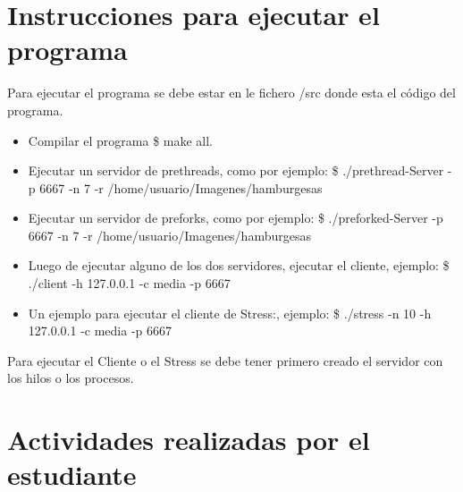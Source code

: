 \documentclass{article}
\begin{document}
\section{Instrucciones para ejecutar el programa}
Para ejecutar el programa se debe estar en le fichero /src donde esta el código del programa.
    \begin{itemize}
        \item Compilar el programa \$ make all.
        \item Ejecutar un servidor de prethreads, como por ejemplo: \$ ./prethread-Server -p 6667 -n 7 -r /home/usuario/Imagenes/hamburgesas
        \item Ejecutar un servidor de preforks, como por ejemplo: \$ ./preforked-Server -p 6667 -n 7 -r /home/usuario/Imagenes/hamburgesas
        \item Luego de ejecutar alguno de los dos servidores, ejecutar el cliente, ejemplo: \$ ./client -h 127.0.0.1 -c media -p 6667
        \item Un ejemplo para ejecutar el cliente de Stress:, ejemplo: \$ ./stress -n 10 -h 127.0.0.1 -c media -p 6667
        
    \end{itemize}
Para ejecutar el Cliente o el Stress se debe tener primero creado el servidor con los hilos o los procesos.

\section{Actividades realizadas por el estudiante}
\end{document}
